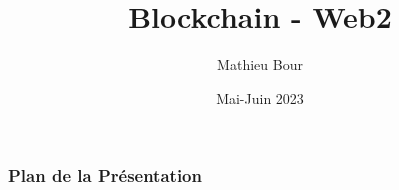 \documentclass[xcolor=x11names,aspectratio=169]{beamer}
\title[Blockchain]{Blockchain - Web2}
\institute[]{Mewo Informatique}
\author{Mathieu Bour}
\date{Mai-Juin 2023}
\begin{document}
\begin{frame}
  \maketitle
\end{frame}

\setlength{\parskip}{0.7em}



\begin{frame}
  \frametitle{Plan de la Présentation}
  \setcounter{tocdepth}{1}
  \tableofcontents
\end{frame}




\end{document}
